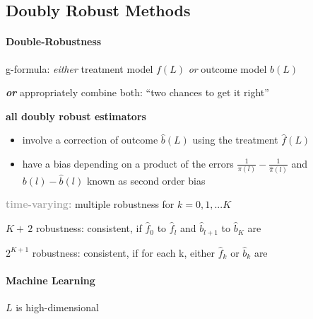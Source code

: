 \documentclass[8pt,twoside]{extarticle}
\begin{document}
\subsection{Doubly Robust Methods}

\begin{multicols}{2}



\paragraph{Double-Robustness} \citep{hernan2023causal}

 g-formula: \textit{either} treatment model $f(L)$  \textit{or} outcome model $b(L)$ 

 \textit{\textbf{or}} appropriately combine both: ``two chances to get it right''

 \textbf{all doubly robust estimators} 
\begin{itemize}[leftmargin=*, itemsep=0em, topsep=0pt, partopsep=0pt,parsep=0pt]
\item involve a correction of  outcome $\hat{b}(L)$ using the treatment $\hat{f}(L)$
\item have a bias depending on a product of the errors $\frac{1}{\pi(l)} - \frac{1}{\hat{\pi}(l)}$ and $b(l) - \hat{b}(l)$ known as second order bias 
\end{itemize}

\vspace{0.2em}
 \colorbox{lightgray!20!white}{\begin{minipage}{28em}

\textbf{\textcolor{darkgray}{time-varying:}} 
  multiple robustness for $k=0,1,...K$
  
 $K{+}\,2$ robustness: consistent, if $\hat{f}_0$ to $\hat{f}_l$ and $\hat{b}_{l+1}$ to $\hat{b}_K$ are 
 
 $2^{K{+}1}$ robustness: consistent, if for each k, either  $\hat{f}_k$ or $\hat{b}_k$ are
  
  \end{minipage}}

\paragraph{Machine Learning} $L$ is high-dimensional


\end{multicols}
\end{document}
